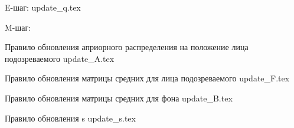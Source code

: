 \documentclass[unicode]{article}
\begin{document}
	E-шаг:
	{update_q.tex}
	
	M-шаг:
	
	Правило обновления априорного распределения на положение лица подозреваемого
	{update_A.tex}
	
	Правило обновления матрицы средних для лица подозреваемого
	{update_F.tex}
	
	Правило обновления матрицы средних для фона
	{update_B.tex}
	
	Правило обновления s
	{update_s.tex}
\end{document}
